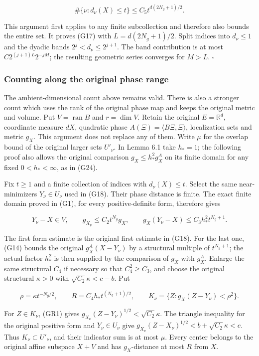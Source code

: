 \documentclass[
  11pt,
]{article}
\begin{document}
\[
\#\{\nu:d_\nu(X)\leq t\}
\leq C_5t^{d(2N_g+1)/2}.
\]

This argument first applies to any finite subcollection and therefore
also bounds the entire set. It proves (G17) with \(L=d(2N_g+1)/2\).
Split indices into \(d_\nu\leq1\) and the dyadic bands
\(2^j<d_\nu\leq2^{j+1}\). The band contribution is at most
\(C2^{(j+1)L}2^{-jM}\); the resulting geometric series converges for
\(M>L\). \(\square\)

\subsubsection{Counting along the original phase
range}\label{counting-along-the-original-phase-range}

The ambient-dimensional count above remains valid. There is also a
stronger count which uses the rank of the original phase map and keeps
the original metric and volume. Put \(V=\operatorname{ran}B\) and
\(r=\dim V\). Retain the original \(E=\mathbb R^d\), coordinate measure
\(dX\), quadratic phase \(A(\Xi)=\langle B\Xi,\Xi\rangle\), localization
sets and metric \(g_X\). This argument does not replace any of them.
Write \(\mu\) for the overlap bound of the original larger sets
\(U'_\nu\). In Lemma 6.1 take \(h_*=1\); the following proof also allows
the original comparison \(g_X\leq h_*^2g_X^A\) on its finite domain for
any fixed \(0<h_*<\infty\), as in (G24).

Fix \(t\geq1\) and a finite collection of indices with
\(d_\nu(X)\leq t\). Select the same near-minimizers \(Y_\nu\in U_\nu\)
used in (G18). Their phase distance is finite. The exact finite domain
proved in (G1), for every positive-definite form, therefore gives

\[
Y_\nu-X\in V,\qquad
g_{X_\nu}\leq C_2t^{N_g}g_X,\qquad
g_X(Y_\nu-X)\leq C_3h_*^2t^{N_g+1}.
\tag{GR1}
\]

The first form estimate is the original first estimate in (G18). For the
last one, (G14) bounds the original \(g_X^A(X-Y_\nu)\) by a structural
multiple of \(t^{N_g+1}\); the actual factor \(h_*^2\) is then supplied
by the comparison of \(g_X\) with \(g_X^A\). Enlarge the same structural
\(C_4\) if necessary so that \(C_4^2\geq C_3\), and choose the original
structural \(\kappa>0\) with \(\sqrt{C_2}\kappa<c-b\). Put

\[
\rho=\kappa t^{-N_g/2},\qquad
R=C_4h_*t^{(N_g+1)/2},\qquad
K_\nu=\{Z:g_X(Z-Y_\nu)<\rho^2\}.
\tag{GR2}
\]

For \(Z\in K_\nu\), (GR1) gives
\(g_{X_\nu}(Z-Y_\nu)^{1/2}<\sqrt{C_2}\kappa\). The triangle inequality
for the original positive form and \(Y_\nu\in U_\nu\) give
\(g_{X_\nu}(Z-X_\nu)^{1/2}<b+\sqrt{C_2}\kappa<c\). Thus
\(K_\nu\subset U'_\nu\), and their indicator sum is at most \(\mu\).
Every center belongs to the original affine subspace \(X+V\) and has
\(g_X\)-distance at most \(R\) from \(X\).
\end{document}

